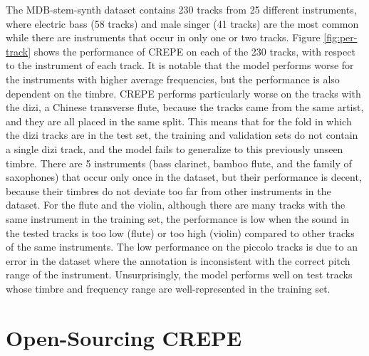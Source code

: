 The MDB-stem-synth dataset contains 230 tracks from 25 different instruments, where electric bass (58 tracks) and male singer (41 tracks) are the most common while there are instruments that occur in only one or two tracks.
Figure \ref{fig:per-track} shows the performance of CREPE on each of the 230 tracks, with respect to the instrument of each track.
It is notable that the model performs worse for the instruments with higher average frequencies, but the performance is also dependent on the timbre.
CREPE performs particularly worse on the tracks with the dizi, a Chinese transverse flute, because the tracks came from the same artist, and they are all placed in the same split.
This means that for the fold in which the dizi tracks are in the test set, the training and validation sets do not contain a single dizi track, and the model fails to generalize to this previously unseen timbre.
There are 5 instruments (bass clarinet, bamboo flute, and the family of saxophones) that occur only once in the dataset, but their performance is decent, because their timbres do not deviate too far from other instruments in the dataset.
For the flute and the violin, although there are many tracks with the same instrument in the training set, the performance is low when the sound in the tested tracks is too low (flute) or too high (violin) compared to other tracks of the same instruments.
The low performance on the piccolo tracks is due to an error in the dataset where the annotation is inconsistent with the correct pitch range of the instrument.
Unsurprisingly, the model performs well on test tracks whose timbre and frequency range are well-represented in the training set.

\section{Open-Sourcing CREPE}

